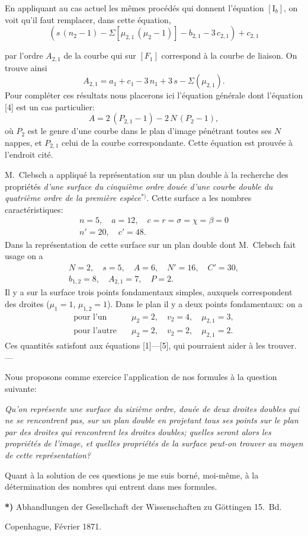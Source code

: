 \documentclass{article}
\begin{document}
En appliquant au cas actuel les mêmes procédés qui donnent l'équation $[\mathrm{I}_b]$, on voit qu'il faut remplacer, dans cette équation,
\[
(s\,(n_2 - 1) - \Sigma[\mu_{2, 1}\,(\mu_2 - 1)] - b_{2, 1} - 3\,c_{2, 1}) + c_{2, 1}
\]

par l'ordre $A_{2, 1}$ de la courbe qui sur $[F_1]$ correspond à la courbe de liaison. On trouve ainsi
\[
A_{2, 1} = a_1 + c_1 - 3\,n_1 + 3\,s - \Sigma(\mu_{2, 1}). \tag*{[5]}
\]
Pour compléter ces résultats nous placerons ici l'équation générale dont l'équation [4] est un cas particulier:
\[
A = 2\,(P_{2, 1} - 1) - 2\,N\,(P_2 - 1),
\]
où $P_2$ est le genre d'une courbe dans le plan d'image pénétrant toutes ses $N$ nappes, et $P_{2, 1}$ celui de la courbe correspondante. Cette équation est prouvée à l'endroit cité.

M.~Clebsch a appliqué la représentation sur un plan double à la recherche des propriétés \emph{d'une surface du cinquième ordre douée d'une courbe double du quatrième ordre de la première espèce}${}^{*)}$. Cette surface a les nombres caractéristiques:
\[
\begin{gathered}
n = 5, \quad a = 12, \quad c = r = \sigma = \chi = \beta = 0 \\
n' = 20, \quad c' = 48.
\end{gathered}
\]
Dans la représentation de cette surface sur un plan double dont M.~Clebsch fait usage on a
\[
\begin{gathered}
N = 2, \quad s = 5, \quad A = 6, \quad N' = 16, \quad C' = 30, \\
b_{1, 2} = 8, \quad A_{2, 1} = 7, \quad P = 2.
\end{gathered}
\]
Il y a sur la surface trois points fondamentaux simples, auxquels correspondent des droites ($\mu_1 = 1$, $\mu_{1, 2} = 1$). Dans le plan il y a deux points fondamentaux: on a
\[
\begin{aligned}
\text{pour l'un} \quad &\mu_2 = 2, \quad v_2 = 4, \quad \mu_{2, 1} = 3, \\
\text{pour l'autre} \quad &\mu_2 = 2, \quad v_2 = 2, \quad \mu_{2, 1} = 2.
\end{aligned}
\]
Ces quantités satisfont aux équations [1]---[5], qui pourraient aider à les trouver. ---

Nous proposons comme exercice l'application de nos formules à la question suivante:

\emph{Qu'on représente une surface du sixième ordre, douée de deux droites doubles qui ne se rencontrent pas, sur un plan double en projetant tous ses points sur le plan par des droites qui rencontrent les droites doubles; quelles seront alors les propriétés de l'image, et quelles propriétés de la surface peut-on trouver au moyen de cette représentation?}

Quant à la solution de ces questions je me suis borné, moi-même, à la détermination des nombres qui entrent dans mes formules.

\textbf{*)} Abhandlungen der Gesellschaft der Wissenschaften zu Göttingen 15.~Bd.

Copenhague, Février 1871.
\end{document}
